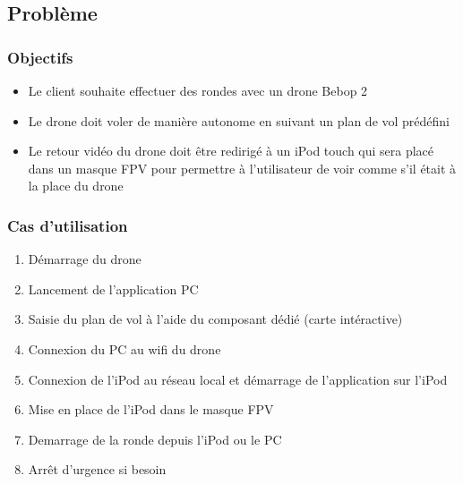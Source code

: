\documentclass{beamer}
\begin{document}
	\begin{frame}
		\section{Problème}
		\begin{center}
		\frametitle{Objectifs}
		\begin{itemize}
		    \item Le client souhaite effectuer des rondes avec un drone Bebop 2\\
		    \item Le drone doit voler de manière autonome en suivant un plan de vol prédéfini \\
		    \item Le retour vidéo du drone doit être redirigé à un iPod touch qui sera placé dans un masque FPV pour permettre à l'utilisateur de voir comme s'il était à la place du drone\\
		\end{itemize}
		   
		\end{center}
	\end{frame}
	\begin{frame}
		\begin{center}
		\frametitle{Cas d'utilisation}
		\begin{enumerate}
		    \item Démarrage du drone\\
		    \item Lancement de l'application PC\\
		    \item Saisie du plan de vol à l'aide du composant dédié (carte intéractive)\\
		    \item Connexion du PC au wifi du drone
		    \item Connexion de l'iPod au réseau local et démarrage de l'application sur l'iPod
		    \item Mise en place de l'iPod dans le masque FPV
		    \item Demarrage de la ronde depuis l'iPod ou le PC
		    \item Arrêt d'urgence si besoin
		\end{enumerate}
		   
		\end{center}
	\end{frame}
	
\end{document}
